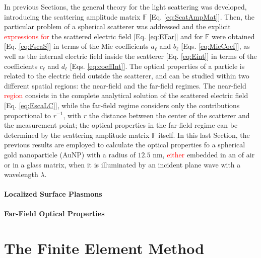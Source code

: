 \documentclass[11pt]{Latex/Classes/PhDthesisPSnPDF}
\begin{document}
         In previous Sections, the general theory for the light scattering was developed, introducing the scattering amplitude matrix $\mathbb{F}$ [Eq. \eqref{eq:ScatAmpMat}]. Then, the particular problem of a spherical scatterer was addressed and the explicit \textcolor{red}{expressions for} the scattered electric field [Eq. \eqref{eq:EFar}] and for $\mathbb{F}$ were obtained [Eq. \eqref{eq:FscaS}] in terms of the Mie coefficients $a_\ell$ and  $b_\ell$ [Eqs. \eqref{eq:MieCoef}], as well as the internal electric field inside the scatterer [Eq. \eqref{eq:Eint}] in terms of the coefficients $c_\ell$ and $d_\ell$ [Eqs. \eqref{eq:coeffInt}]. The  optical properties of a particle is related to the electric field outside the scatterer,  and can be studied within two different spatial regions: the near-field and the far-field regimes. The near-field \textcolor{red}{region} consists in the complete analytical solution of the scattered electric field [Eq. \eqref{eq:EscaLC}], while the far-field regime considers only the contributions proportional to $r^{-1}$, with $r$ the distance between the center of the scatterer and the measurement point; the optical properties in the far-field regime can be determined by the scattering amplitude matrix $\mathbb{F}$ itself.  In this last Section, the previous results are employed to calculate the optical properties fo  a spherical gold nanoparticle (AuNP) with a radius of $12.5$ nm, \textcolor{red}{either} embedded in an of air or in a glass matrix, when it is illuminated by an incident plane wave with a wavelength $\lambda$.

            \subsubsection{Localized Surface Plasmons}
             \label{sss:LSPR}
             

            \subsubsection{Far-Field Optical Properties}
             \label{sss:FarField}
             


\chapter{The Finite Element Method}
 \label{chapter:FEM}
\end{document}
